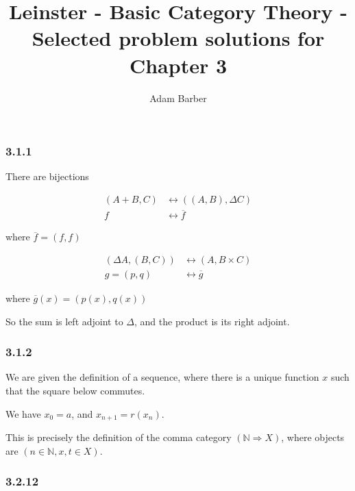 \documentclass{article}
\begin{document}
\title{Leinster - Basic Category Theory - Selected problem solutions for Chapter 3}
\author{Adam Barber}

\maketitle

\subsubsection*{3.1.1}

There are bijections

\begin{align*}
  (A + B, C) &\leftrightarrow ((A,B), \Delta C) \\
  f &\leftrightarrow \overline{f}
\end{align*}

where $\overline{f} = (f,f)$

\begin{align*}
  (\Delta A, (B, C)) &\leftrightarrow (A, B \times C) \\
  g = (p,q) &\leftrightarrow \overline{g}
\end{align*}

where $\overline{g}(x) = (p(x), q(x))$

So the sum is left adjoint to $\Delta$, and the product is its right adjoint.

\subsubsection*{3.1.2}

We are given the definition of a sequence, where there is a unique function $x$ such that the square below commutes.

We have $x_0 = a$, and $x_{n+1} = r(x_n)$.

\begin{center}
\end{center}

This is precisely the definition of the comma category $(\mathds{N} \Rightarrow X)$, where objects are $(n \in \mathds{N}, x, t \in X)$.

\subsubsection*{3.2.12}
\end{document}

